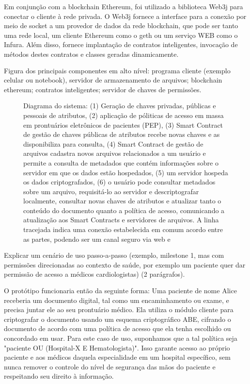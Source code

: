 \documentclass[a4paper,11pt]{article}
\begin{document}
Em conjunção com a blockchain Ethereum, foi utilizado a biblioteca Web3j para conectar o cliente à rede privada.
O Web3j fornece a interface para a conexão por meio de socket a um provedor de dados da rede blockchain, que pode ser tanto uma rede local, um cliente Ethereum como o geth ou um serviço WEB como o Infura. Além disso, fornece implantação de contratos inteligentes, invocação de métodos destes contratos e classes geradas dinamicamente.

{\color{ForestGreen}Figura dos principais componentes em alto nível: programa cliente (exemplo celular ou notebook), servidor de armazenamento de arquivos; blockchain ethereum; contratos inteligentes; servidor de chaves de permissões.}

\begin{figure}[H]
  \centering
  
  \caption{Diagrama do sistema: (1) Geração de chaves privadas, públicas e pessoais de atributos, (2) aplicação de póliticas de acesso em massa em prontuários eletrônicos de pacientes (PEP), (3) Smart Contract de gestão de chaves públicas de atributos recebe novas chaves e as disponibiliza para consulta, (4) Smart Contract de gestão de arquivos cadastra novos arquivos relacionados a um usuário e permite a consulta de metadados que contém informações sobre o servidor em que os dados estão hospedados, (5) um servidor hospeda os dados criptografados, (6) o usuário pode consultar metadados sobre um arquivo, requisitá-lo ao servidor e descriptografar localmente, consultar novas chaves de atributos e atualizar tanto o conteúdo do documento quanto a política de acesso, comunicando a atualização aos Smart Contracts e servidores de arquivos. A linha tracejada indica uma conexão estabelecida em comum acordo entre as partes, podendo ser um canal seguro via web e }
  \label{fig:diagramaDCPABE}
\end{figure}

{\color{ForestGreen}Explicar um cenário de uso passo-a-passo (exemplo, milestone 1, mas com permissões direcionadas ao contexto de saúde, por exemplo um paciente quer dar permissão de acesso a médicos cardiologistas) (2 parágrafos)}.

O protótipo funcionaria então da seguinte forma: Uma paciente de nome Alice receberia um documento digital, tal como um encaminhamento ou exame, e precisa juntar ele ao seu prontuário médico. Ela utiliza o módulo cliente para criptografar o documento usando um esquema criptográfico ABE, cifrando o documento de acordo com uma política de acesso que ela tenha escolhido ou concordado em usar.
Para este caso de uso, suponhamos que a tal política seja "paciente OU (Hospital-X E Hematologista)".
Isso garante acesso ao próprio paciente e aos médicos daquela especialidade em um hospital específico, sem nunca remover o controle do nível de segurança das mãos do paciente e respeitando seu direito à informação.
\end{document}
